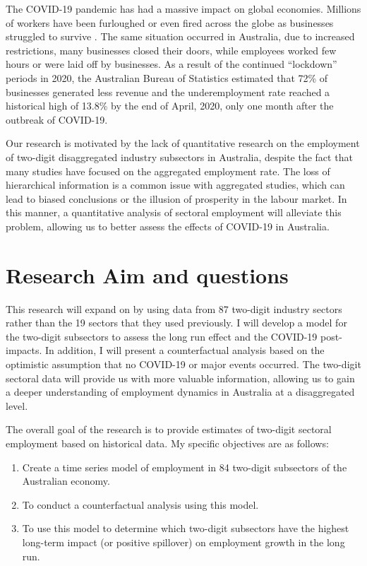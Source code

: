 \documentclass{monashthesis}
\begin{document}
The COVID-19 pandemic has had a massive impact on global economies. Millions of workers have been furloughed or even fired across the globe as businesses struggled to survive \autocite{ny2020}. The same situation occurred in Australia, due to increased restrictions, many businesses closed their doors, while employees worked few hours or were laid off by businesses. As a result of the continued ``lockdown'' periods in 2020, the Australian Bureau of Statistics \autocite{ABS2021} estimated that 72\% of businesses generated less revenue and the underemployment rate reached a historical high of 13.8\% by the end of April, 2020, only one month after the outbreak of COVID-19.

Our research is motivated by the lack of quantitative research on the employment of two-digit disaggregated industry subsectors in Australia, despite the fact that many studies have focused on the aggregated employment rate. The loss of hierarchical information is a common issue with aggregated studies, which can lead to biased conclusions or the illusion of prosperity in the labour market. In this manner, a quantitative analysis of sectoral employment will alleviate this problem, allowing us to better assess the effects of COVID-19 in Australia.

\hypertarget{research-aim-and-questions}{%
\section{Research Aim and questions}\label{research-aim-and-questions}}

This research will expand on \textcite{anderson2020} by using data from 87 two-digit industry sectors rather than the 19 sectors that they used previously. I will develop a model for the two-digit subsectors to assess the long run effect and the COVID-19 post-impacts. In addition, I will present a counterfactual analysis based on the optimistic assumption that no COVID-19 or major events occurred. The two-digit sectoral data will provide us with more valuable information, allowing us to gain a deeper understanding of employment dynamics in Australia at a disaggregated level.

The overall goal of the research is to provide estimates of two-digit sectoral employment based on historical data. My specific objectives are as follows:

\begin{enumerate}
\def\labelenumi{\arabic{enumi}.}
\item
  Create a time series model of employment in 84 two-digit subsectors of the Australian economy.
\item
  To conduct a counterfactual analysis using this model.
\item
  To use this model to determine which two-digit subsectors have the highest long-term impact (or positive spillover) on employment growth in the long run.
\end{enumerate}
\end{document}
